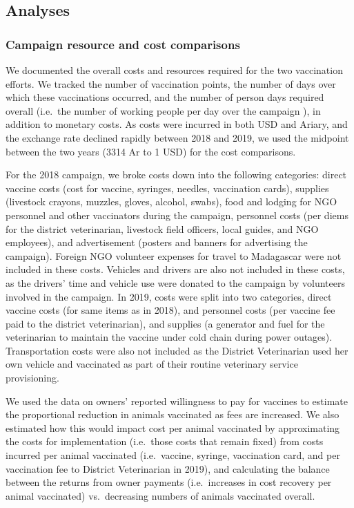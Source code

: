 \documentclass[tropicalmed,article,submit,moreauthors,pdftex]{mdpi}
\begin{document}
\hypertarget{analyses}{%
\subsection{Analyses}\label{analyses}}

\hypertarget{campaign-resource-and-cost-comparisons}{%
\subsubsection{Campaign resource and cost
comparisons}\label{campaign-resource-and-cost-comparisons}}

We documented the overall costs and resources required for the two
vaccination efforts. We tracked the number of vaccination points, the
number of days over which these vaccinations occurred, and the number of
person days required overall (i.e.~the number of working people per day
over the campaign \citep{mazeri2021}), in addition to monetary costs. As
costs were incurred in both USD and Ariary, and the exchange rate
declined rapidly between 2018 and 2019, we used the midpoint between the
two years (3314 Ar to 1 USD) for the cost comparisons.

For the 2018 campaign, we broke costs down into the following
categories: direct vaccine costs (cost for vaccine, syringes, needles,
vaccination cards), supplies (livestock crayons, muzzles, gloves,
alcohol, swabs), food and lodging for NGO personnel and other
vaccinators during the campaign, personnel costs (per diems for the
district veterinarian, livestock field officers, local guides, and NGO
employees), and advertisement (posters and banners for advertising the
campaign). Foreign NGO volunteer expenses for travel to Madagascar were
not included in these costs. Vehicles and drivers are also not included
in these costs, as the drivers' time and vehicle use were donated to the
campaign by volunteers involved in the campaign. In 2019, costs were
split into two categories, direct vaccine costs (for same items as in
2018), and personnel costs (per vaccine fee paid to the district
veterinarian), and supplies (a generator and fuel for the veterinarian
to maintain the vaccine under cold chain during power outages).
Transportation costs were also not included as the District Veterinarian
used her own vehicle and vaccinated as part of their routine veterinary
service provisioning.

We used the data on owners' reported willingness to pay for vaccines to
estimate the proportional reduction in animals vaccinated as fees are
increased. We also estimated how this would impact cost per animal
vaccinated by approximating the costs for implementation (i.e.~those
costs that remain fixed) from costs incurred per animal vaccinated
(i.e.~vaccine, syringe, vaccination card, and per vaccination fee to
District Veterinarian in 2019), and calculating the balance between the
returns from owner payments (i.e.~increases in cost recovery per animal
vaccinated) vs.~decreasing numbers of animals vaccinated overall.
\end{document}
